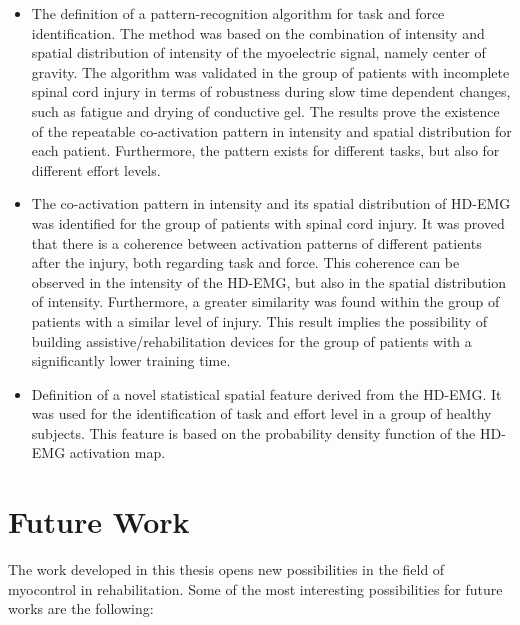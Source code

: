 \begin{itemize}
\item The definition of a pattern-recognition algorithm for task and force identification. The method was based on the combination of intensity and spatial distribution of intensity of the myoelectric signal, namely center of gravity. The algorithm was validated in the group of patients with incomplete spinal cord injury in terms of robustness during slow time dependent changes, such as fatigue and drying of conductive gel. The results prove the existence of the repeatable co-activation pattern in intensity and spatial distribution for each patient. Furthermore, the pattern exists for different tasks, but also for different effort levels.

\item The co-activation pattern in intensity and its spatial distribution of HD-EMG was identified for the group of patients with spinal cord injury. It was proved that there is a coherence between activation patterns of different patients after the injury, both regarding task and force. This coherence can be observed in the intensity of the HD-EMG, but also in the spatial distribution of intensity. Furthermore, a greater similarity was found within the group of patients with a similar level of injury. This result implies the possibility of building assistive/rehabilitation devices for the group of patients with a significantly lower training time.

\item Definition of a novel statistical spatial feature derived from the HD-EMG. It was used for the identification of task and effort level in a group of healthy subjects. This feature is based on the probability density function of the HD-EMG activation map. 


\end{itemize}

\section{Future Work}
\label{sec:fw}
The work developed in this thesis opens new possibilities in the field of myocontrol in rehabilitation. Some of the most interesting possibilities for future works are the following: 

